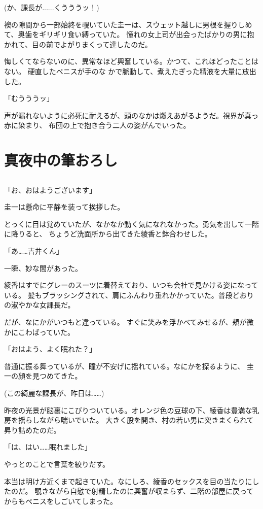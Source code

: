 ﻿\documentclass[
    book,tate,
    line_length=30zw,
    jafontsize=12pt,
    paper=b5j,
    landscape,
    ]{jlreq}
\begin{document}
(か、課長が......くうううッ！)

襖の隙間から一部始終を覗いていた圭一は、スウェット越しに男根を握りしめて、奥歯をギリギリ食い縛っていた。
憧れの女上司が出会ったばかりの男に抱かれて、目の前でよがりまくって達したのだ。

悔しくてならないのに、異常なほど興奮している。かつて、これほどったことはない。
硬直したペニスが手のな かで脈動して、煮えたぎった精液を大量に放出した。

「むうううッ」

声が漏れないように必死に耐えるが、頭のなかは燃えあがるようだ。視界が真っ赤に染まり、
布団の上で抱き合う二人の姿がんでいった。

\chapter{真夜中の筆おろし}

\section*{}

「お、おはようございます」

圭一は懸命に平静を装って挨拶した。

とっくに目は覚めていたが、なかなか動く気になれなかった。勇気を出して一階に降りると、
ちょうど洗面所から出てきた綾香と鉢合わせした。

「あ……吉井くん」

一瞬、妙な間があった。

綾香はすでにグレーのスーツに着替えており、いつも会社で見かける姿になっている。
髪もブラッシングされて、肩にふんわり垂れかかっていた。普段どおりの淑やかな女課長だ。

だが、なにかがいつもと違っている。 すぐに笑みを浮かべてみせるが、頬が微かにこわばっていた。

「おはよう、よく眠れた？」

普通に振る舞っているが、瞳が不安げに揺れている。なにかを探るように、 圭一の顔を見つめてきた。

(この綺麗な課長が、昨日は……)

昨夜の光景が脳裏にこびりついている。オレンジ色の豆球の下、綾香は豊満な乳房を揺らしながら喘いでいた。
大きく股を開き、村の若い男に突きまくられて昇り詰めたのだ。

「は、はい……眠れました」

やっとのことで言葉を絞りだす。

本当は明け方近くまで起きていた。なにしろ、綾香のセックスを目の当たりにしたのだ。
覗きながら自慰で射精したのに興奮が収まらず、二階の部屋に戻ってからもペニスをしごいてしまった。
\end{document}
